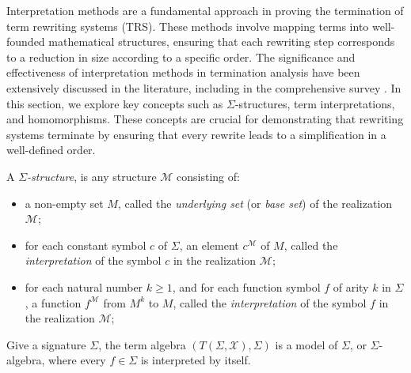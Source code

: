 
Interpretation methods are a fundamental approach in proving the termination of term rewriting systems (TRS). These methods involve mapping terms into well-founded mathematical structures, ensuring that each rewriting step corresponds to a reduction in size according to a specific order. The significance and effectiveness of interpretation methods in termination analysis have been extensively discussed in the literature, including in the comprehensive survey \cite{dersh1987termination}.
In this section, we explore key concepts such as 
$\Sigma$-structures, term interpretations, and homomorphisms. These concepts are crucial for demonstrating that rewriting systems terminate by ensuring that every rewrite leads to a simplification in a well-defined order.

\begin{definition}
  A \textit{$\Sigma$-structure}, is any structure $\mathcal{M}$ consisting of:
  \begin{itemize}
    \item a non-empty set $M$, called the \textit{underlying set} (or \textit{base set}) of the realization $\mathcal{M}$;
    \item for each constant symbol $c$ of $\Sigma$, an element $c^{\mathcal{M}}$ of $M$, called the \textit{interpretation} of the symbol $c$ in the realization $\mathcal{M}$;
    \item for each natural number $k \mathop{\geq} 1$, and for each function symbol $f$ of arity $k$ in $\Sigma$, a function $f^{\mathcal{M}}$ from $M^k$ to $M$, called the \textit{interpretation} of the symbol $f$ in the realization $\mathcal{M}$;
  \end{itemize}
\end{definition}

\begin{example}
  Give a signature $\Sigma$, the term algebra $(T(\Sigma, \mathcal{X}), \Sigma)$ is a model of $\Sigma$, or $\Sigma$-algebra, where every $f \mathop{\in} \Sigma$ is interpreted by itself.
\end{example}

